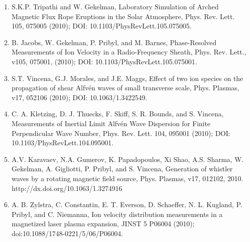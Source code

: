 \documentclass[11pt]{article}
\begin{document}
\begin{enumerate}
\item   S.K.P. Tripathi and W. Gekelman, Laboratory Simulation of Arched Magnetic Flux Rope Eruptions in the Solar Atmosphere, Phys. Rev. Lett. 105, 075005 (2010); DOI: 10.1103/PhysRevLett.105.075005.

\item   B. Jacobs, W. Gekelman, P. Pribyl, and M. Barnes, Phase-Resolved Measurements of Ion Velocity in a Radio-Frequency Sheath, Phys. Rev. Lett., v105, 075001, (2010); DOI: 10.1103/PhysRevLett.105.075001.

\item   S.T. Vincena, G.J. Morales, and J.E. Maggs, Effect of two ion species on the propagation of shear Alfv\'{e}n waves of small transverse scale, Phys. Plasmas, v17, 052106 (2010); DOI: 10.1063/1.3422549.

\item   C. A. Kletzing, D. J. Thuecks, F. Skiff, S. R. Bounds, and S. Vincena, Measurements of Inertial Limit Alfv\'{e}n Wave Dispersion for Finite Perpendicular Wave Number, Phys. Rev. Lett. 104, 095001 (2010); DOI: 10.1103/PhysRevLett.104.095001.

\item  A.V. Karavaev, N.A. Gumerov, K. Papadopoulos, Xi Shao, A.S. Sharma, W. Gekelman, A. Gigliotti, P. Pribyl, and S. Vincena, Generation of whistler waves by a rotating magnetic field source, Phys. Plasmas, v17, 012102, 2010. http://dx.doi.org/10.1063/1.3274916

\item  A. B. Zylstra, C. Constantin, E. T. Everson, D. Schaeffer, N. L. Kugland, P. Pribyl, and C. Niemanna, Ion velocity distribution measurements in a magnetized laser plasma expansion, JINST 5 P06004 (2010); doi:10.1088/1748-0221/5/06/P06004.

\end{enumerate}
	
\end{document}
